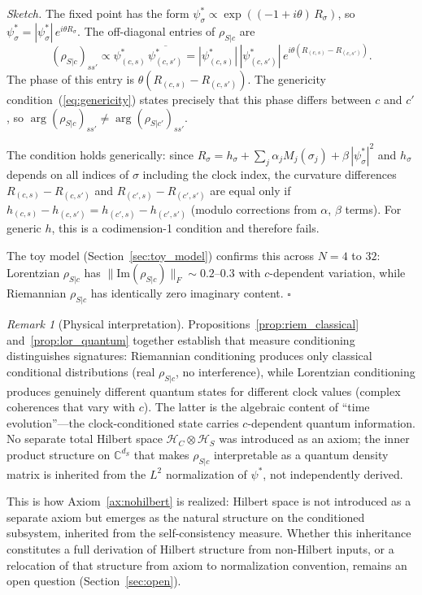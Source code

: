 \documentclass[12pt,a4paper]{article}
\theoremstyle{definition}
\theoremstyle{remark}
\newtheorem{remark}{Remark}
\begin{document}
\noindent\emph{Sketch.}
The fixed point has the form $\psi^*_\sigma \propto \exp((-1 +
i\theta)\,R_\sigma)$, so $\psi^*_\sigma = |\psi^*_\sigma|\,
e^{i\theta R_\sigma}$. The off-diagonal entries of $\rho_{S|c}$ are
\[
(\rho_{S|c})_{ss'} \propto \psi^*_{(c,s)}\,\overline{\psi^*_{(c,s')}}
= |\psi^*_{(c,s)}|\,|\psi^*_{(c,s')}|\,
e^{i\theta(R_{(c,s)} - R_{(c,s')})}.
\]
The phase of this entry is $\theta(R_{(c,s)} - R_{(c,s')})$. The
genericity condition~(\ref{eq:genericity}) states precisely that this
phase differs between $c$ and $c'$, so
$\arg(\rho_{S|c})_{ss'} \neq \arg(\rho_{S|c'})_{ss'}$.

The condition holds generically: since $R_\sigma = h_\sigma + \sum_j
\alpha_j M_j(\sigma_j) + \beta\,|\psi^*_\sigma|^2$ and $h_\sigma$
depends on all indices of $\sigma$ including the clock index, the
curvature differences $R_{(c,s)} - R_{(c,s')}$ and $R_{(c',s)} -
R_{(c',s')}$ are equal only if $h_{(c,s)} - h_{(c,s')} = h_{(c',s)} -
h_{(c',s')}$ (modulo corrections from $\alpha$, $\beta$ terms). For
generic $h$, this is a codimension-1 condition and therefore fails.

The toy model (Section~\ref{sec:toy_model}) confirms this across
$N = 4$ to $32$: Lorentzian $\rho_{S|c}$ has
$\|\mathrm{Im}(\rho_{S|c})\|_F \sim 0.2$--$0.3$ with $c$-dependent
variation, while Riemannian $\rho_{S|c}$ has identically zero imaginary
content. \hfill$\square$

\medskip

\begin{remark}[Physical interpretation]
\label{rem:pw_lorentzian}
Propositions~\ref{prop:riem_classical} and~\ref{prop:lor_quantum}
together establish that measure conditioning distinguishes signatures:
Riemannian conditioning produces only classical conditional
distributions (real $\rho_{S|c}$, no interference), while Lorentzian
conditioning produces genuinely different quantum states for different
clock values (complex coherences that vary with $c$). The latter is the
algebraic content of ``time evolution''---the clock-conditioned state
carries $c$-dependent quantum information. No separate total Hilbert
space $\mathcal{H}_C \otimes \mathcal{H}_S$ was introduced as an axiom;
the inner product structure on $\mathbb{C}^{d_S}$ that makes
$\rho_{S|c}$ interpretable as a quantum density matrix is inherited from
the $L^2$ normalization of $\psi^*$, not independently derived.
\end{remark}

This is how Axiom~\ref{ax:nohilbert} is realized: Hilbert space is not
introduced as a separate axiom but emerges as the natural structure on
the conditioned subsystem, inherited from the self-consistency measure.
Whether this inheritance constitutes a full derivation of Hilbert
structure from non-Hilbert inputs, or a relocation of that structure
from axiom to normalization convention, remains an open question
(Section~\ref{sec:open}).
\end{document}
